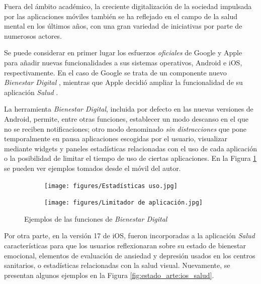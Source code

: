         Fuera del ámbito académico, la creciente digitalización de la sociedad impulsada por las aplicaciones móviles también se ha reflejado en el campo de la salud mental en los últimos años, con una gran variedad de iniciativas por parte de numerosos actores.

        Se puede considerar en primer lugar los esfuerzos \textit{oficiales} de Google y Apple para añadir nuevas funcionalidades a sus sistemas operativos, Android e iOS, respectivamente. En el caso de Google se trata de un componente nuevo \textit{Bienestar Digital} \cite{android_bienestar_nodate}, mientras que Apple decidió ampliar la funcionalidad de su aplicación \textit{Salud} \cite{noauthor_apple_2023}.
        
        La herramienta \textit{Bienestar Digital}, incluida por defecto en las nuevas versiones de Android, permite, entre otras funciones, establecer un modo descanso en el que no se reciben notificaciones; otro modo denominado \textit{sin distracciones} que pone temporalmente en pausa aplicaciones escogidas por el usuario, visualizar mediante \glspl{widget} y paneles estadísticas relacionadas con el uso de cada aplicación o la posibilidad de limitar el tiempo de uso de ciertas aplicaciones. En la Figura \ref{fig:estado_arte:bienestar_digital} se pueden ver ejemplos tomados desde el móvil del autor.

        \begin{figure}[h]
            \begin{subfigure}[t]{0.48\textwidth}
                \texttt{[image: figures/Estadísticas uso.jpg]}
            \end{subfigure}
            \hfill
            \begin{subfigure}[t]{0.49\textwidth}
                \texttt{[image: figures/Limitador de aplicación.jpg]}
            \end{subfigure}
            \caption{Ejemplos de las funciones de \textit{Bienestar Digital}}
            \label{fig:estado_arte:bienestar_digital}
        \end{figure}

        Por otra parte, en la versión 17 de iOS, fueron incorporadas a la aplicación \textit{Salud} características para que los usuarios reflexionaran sobre su estado de bienestar emocional, elementos de evaluación de ansiedad y depresión usados en los centros sanitarios, o estadísticas relacionadas con la salud visual. Nuevamente, se presentan algunos ejemplos en la Figura \ref{fig:estado_arte:ios_salud}.

